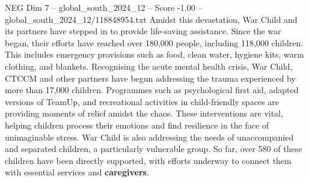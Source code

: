\begin{textsample}{NEG Dim 7 – global\_south\_2024\_12 – Score -1.00 – global\_south\_2024\_12/118848954.txt}
Amidst this devastation, War Child and its partners have stepped in to provide life-saving assistance.
Since the war began, their efforts have reached over 180,000 people, including 118,000 children.
This includes emergency provisions such as food, clean water, hygiene kits, warm clothing, and blankets.
Recognising the acute mental health crisis, War Child, CTCCM and other partners have begun addressing the trauma experienced by more than 17,000 children.
Programmes such as psychological first aid, adapted versions of TeamUp, and recreational activities in child-friendly spaces are providing moments of relief amidst the chaos.
These interventions are vital, helping children process their emotions and find resilience in the face of unimaginable stress.
War Child is also addressing the needs of unaccompanied and separated children, a particularly vulnerable group.
So far, over 580 of these children have been directly supported, with efforts underway to connect them with essential services and \textbf{caregivers}.

\end{textsample}
